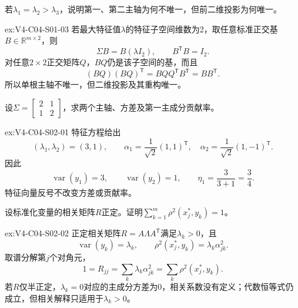 \begin{SLChapterExercisePairSection}
\begin{exercise}\label{ex:V4-C04-S01-03}
若$\lambda_1=\lambda_2>\lambda_3$，说明第一、第二主轴为何不唯一，但前二维投影为何唯一。
\end{exercise}
\ifSLFullEdition
{}\label{sol:V4-C04-S01-03}
\begin{chapterexercisesolution}{ex:V4-C04-S01-03}
若最大特征值$\lambda$的特征子空间维数为2，取任意标准正交基$B\in\mathbb R^{m\times2}$，则
\[
\Sigma B=B(\lambda I_2),
\qquad
B^{\mathsf T}B=I_2.
\]
对任意$2\times2$正交矩阵$Q$，$BQ$仍是该子空间的基，而且
\[
(BQ)(BQ)^{\mathsf T}
=BQQ^{\mathsf T}B^{\mathsf T}
=BB^{\mathsf T}.
\]
所以单根主轴不唯一，但二维投影及其重构唯一。
\end{chapterexercisesolution}
\fi

\begin{exercise}\label{ex:V4-C04-S02-01}
设$\Sigma=\begin{bmatrix}2&1\\1&2\end{bmatrix}$，求两个主轴、方差及第一主成分贡献率。
\end{exercise}
\ifSLFullEdition
{}\label{sol:V4-C04-S02-01}
\begin{chapterexercisesolution}{ex:V4-C04-S02-01}
特征方程给出
\[
(\lambda_1,\lambda_2)=(3,1),
\qquad
\alpha_1=\frac1{\sqrt2}(1,1)^{\mathsf T},
\quad
\alpha_2=\frac1{\sqrt2}(1,-1)^{\mathsf T}.
\]
因此
\[
\operatorname{var}(y_1)=3,
\qquad
\operatorname{var}(y_2)=1,
\qquad
\eta_1=\frac{3}{3+1}=\frac34.
\]
特征向量反号不改变方差或贡献率。
\end{chapterexercisesolution}
\fi

\begin{exercise}\label{ex:V4-C04-S02-02}
设标准化变量的相关矩阵$R$正定。证明$\sum_{k=1}^m\rho^2(x_j^*,y_k)=1$。
\end{exercise}
\ifSLFullEdition
{}\label{sol:V4-C04-S02-02}
\begin{chapterexercisesolution}{ex:V4-C04-S02-02}
正定相关矩阵$R=A\Lambda A^{\mathsf T}$满足$\lambda_k>0$，且
\[
\operatorname{var}(y_k)=\lambda_k,
\qquad
\rho^2(x_j^*,y_k)=\lambda_k\alpha_{jk}^2.
\]
取谱分解第$j$个对角元，
\[
1=R_{jj}
=\sum_k\lambda_k\alpha_{jk}^2
=\sum_k\rho^2(x_j^*,y_k).
\]
若$R$仅半正定，$\lambda_k=0$对应的主成分方差为0，相关系数没有定义；代数恒等式仍成立，但相关解释只适用于$\lambda_k>0$。
\end{chapterexercisesolution}
\fi


\end{SLChapterExercisePairSection}
